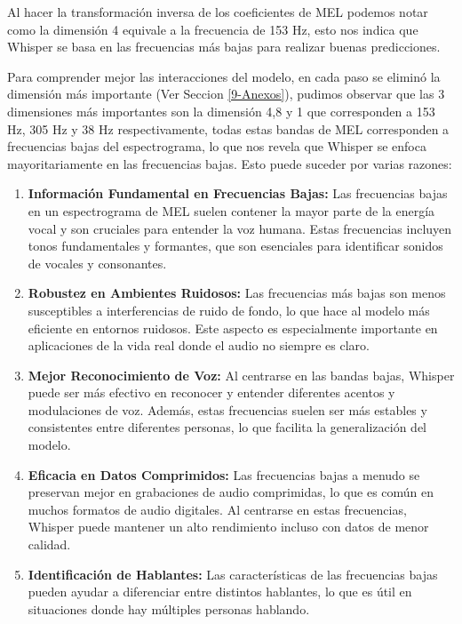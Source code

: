 \documentclass[conference]{IEEEtran}
\begin{document}
Al hacer la transformación inversa de los coeficientes de MEL podemos notar como la dimensión 4 equivale a la frecuencia de 153 Hz, esto nos indica que Whisper se basa en las frecuencias más bajas para realizar buenas predicciones.

Para comprender mejor las interacciones del modelo, en cada paso se eliminó la dimensión más importante (Ver Seccion \ref{9-Anexos}), pudimos observar que las 3 dimensiones más importantes son la dimensión 4,8 y 1 que corresponden a 153 Hz, 305 Hz y 38 Hz respectivamente, todas estas bandas de MEL corresponden a frecuencias bajas del espectrograma, lo que nos revela que Whisper se enfoca mayoritariamente en las frecuencias bajas.
Esto puede suceder por varias razones:
\begin{enumerate}
    \item \textbf{Información Fundamental en Frecuencias Bajas:} Las frecuencias bajas en un espectrograma de MEL suelen contener la mayor parte de la energía vocal y son cruciales para entender la voz humana. Estas frecuencias incluyen tonos fundamentales y formantes, que son esenciales para identificar sonidos de vocales y consonantes.
    \item \textbf{Robustez en Ambientes Ruidosos:} Las frecuencias más bajas son menos susceptibles a interferencias de ruido de fondo, lo que hace al modelo más eficiente en entornos ruidosos. Este aspecto es especialmente importante en aplicaciones de la vida real donde el audio no siempre es claro.
    \item \textbf{Mejor Reconocimiento de Voz:} Al centrarse en las bandas bajas, Whisper puede ser más efectivo en reconocer y entender diferentes acentos y modulaciones de voz. Además, estas frecuencias suelen ser más estables y consistentes entre diferentes personas, lo que facilita la generalización del modelo.
   \item \textbf{Eficacia en Datos Comprimidos:} Las frecuencias bajas a menudo se preservan mejor en grabaciones de audio comprimidas, lo que es común en muchos formatos de audio digitales. Al centrarse en estas frecuencias, Whisper puede mantener un alto rendimiento incluso con datos de menor calidad.
   \item \textbf{Identificación de Hablantes:} Las características de las frecuencias bajas pueden ayudar a diferenciar entre distintos hablantes, lo que es útil en situaciones donde hay múltiples personas hablando.
\end{enumerate}
\end{document}
